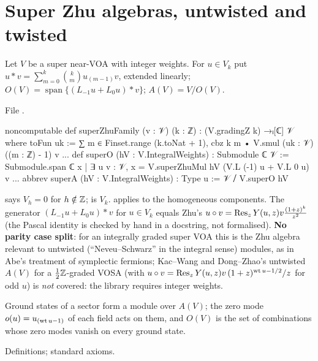\section{Super Zhu algebras, untwisted and twisted}\label{l17:sec:zhu}

\begin{definition}\label{l17:def:superzhu}
Let $V$ be a super near-VOA with integer weights. For $u\in V_k$ put
$u\ast v=\sum_{m=0}^{k}\binom km u_{(m-1)}v$, extended linearly; $O(V)=\operatorname{span}\{(L_{-1}u+L_0u)\ast v\}$;
$A(V)=V/O(V)$.
\end{definition}
\noindent File .
\begin{leancode}
noncomputable def superZhuFamily (v : 𝒱) (k : ℤ) : (V.gradingZ k) →ₗ[ℂ] 𝒱 where
  toFun uk := ∑ m ∈ Finset.range (k.toNat + 1), cbz k m • V.smul (uk : 𝒱) ((m : ℤ) - 1) v
...
def superO (hV : V.IntegralWeights) : Submodule ℂ 𝒱 :=
  Submodule.span ℂ {x | ∃ u v : 𝒱, x = V.superZhuMul hV (V.L (-1) u + V.L 0 u) v}
...
abbrev superA (hV : V.IntegralWeights) : Type u := 𝒱 ⧸ V.superO hV
\end{leancode}
\begin{dictionary}
 says $V_h=0$ for $h\notin{\mathbb{Z}}$;  is $V_k$. 
applies  to the homogeneous components. The generator
$(L_{-1}u+L_0u)\ast v$ for $u\in V_k$ equals Zhu's $u\circ v=\operatorname{Res}_z Y(u,z)v\frac{(1+z)^{k}}{z^2}$ (the
Pascal identity is checked by hand in a docstring, not formalised). \textbf{No parity case split}: for
an integrally graded super VOA this is the Zhu algebra relevant to untwisted (``Neveu--Schwarz'' in the
integral sense) modules, as in Abe's treatment of symplectic fermions; Kac--Wang and Dong--Zhao's
untwisted $A(V)$ for a $\frac12{\mathbb{Z}}$-graded VOSA (with $u\circ v=\operatorname{Res}_z Y(u,z)v\,(1+z)^{\operatorname{wt} u-1/2}/z$ for odd $u$)
is \emph{not} covered: the library requires integer weights.
\end{dictionary}
\begin{physics}
Ground states of a sector form a module over $A(V)$; the zero mode $o(u)=u_{(\operatorname{wt} u-1)}$ of each field
acts on them, and $O(V)$ is the set of combinations whose zero modes vanish on every ground state.
\end{physics}
\begin{status}
Definitions; standard axioms.
\end{status}

